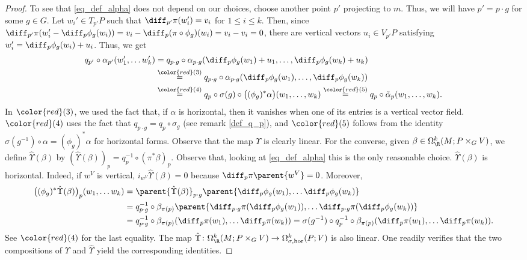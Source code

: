 \begin{proof}
    To see that \eqref{eq_def_alpha} does not depend on our choices, choose another point \(p'\) projecting to \(m\). Thus, we will have \(p'=p\cdot g\) for some \(g \in G\). Let \(w_i'\in T_{p'}P\) such that \(\diff_{p'}\pi(w_i')=v_i\) for \(1 \leq i \leq k\). Then, since \(\diff_{p'}\pi(w_i'-\diff_p\phi_g(w_i))=v_i-\diff_p(\pi \circ \phi_g)(w_i)=v_i-v_i=0\), there are vertical vectors \(u_i \in V_{p'}P\) satisfying \(w_i'=\diff_p\phi_g(w_i)+u_i\). Thus, we get
    \begin{align*}
        q_{p'} \circ {\alpha}_{p'}(w_1', \dots w_k') & = q_{p\cdot g}\circ {\alpha}_{p\cdot g}(\diff_p\phi_g(w_1)+u_1, \ldots, \diff_p\phi_g(w_k)+u_k) \\
        & \overset{{\color{red}(3)}}{=} q_{p\cdot g}\circ {\alpha}_{p\cdot g}(\diff_p\phi_g(w_1), \ldots, \diff_p\phi_g(w_k)) \\
        & \overset{{\color{red}(4)}}{=} q_p \circ \sigma(g) \circ \big((\phi_g)^* {\alpha}\big) (w_1, \ldots , w_k) \overset{{\color{red}(5)}}{=} q_p \circ \tilde{\alpha}_{p}(w_1, \ldots , w_k). 
    \end{align*}
    In \({\color{red}(3)}\), we used the fact that, if \({\alpha}\) is horizontal, then it vanishes when one of its entries is a vertical vector field. \({\color{red}(4)}\) uses the fact that \(q_{p\cdot g}=q_p \circ \sigma_g\) (see remark \ref{def_q_p}), and \({\color{red}(5)}\) follows from the identity \(\sigma(g^{-1}) \circ \alpha = (\phi_g)^*\alpha\) for horizontal forms. Observe that the map \(\Upsilon\) is clearly linear. For the converse, given \(\beta \in \Omega_\R^k(M;P\times_GV)\), we define \(\hat{\Upsilon}(\beta)\) by \( (\hat{\Upsilon}(\beta))_p=q_p^{-1}\circ (\pi^*\beta)_p.\) Observe that, looking at \eqref{eq_def_alpha} this is the only reasonable choice. \(\hat{\Upsilon}(\beta)\) is horizontal. Indeed, if \(w^V\) is vertical, \(i_{w^V}\hat{\Upsilon}(\beta)=0\) because \(\diff_p\pi\parent{w^V}=0\). Moreover,
    \begin{align*}
        \big((\phi_g)^*\hat{\Upsilon}(\beta)\big)_p(w_1, \ldots w_k) & = \parent{\hat{\Upsilon}(\beta)}_{p\cdot g}\parent{\diff_p\phi_g(w_1), \ldots \diff_p\phi_g(w_k)}\\
        &=q_{p\cdot g}^{-1}\circ \beta_{\pi(p)}\parent{\diff_{p\cdot g}\pi(\diff_p\phi_g(w_1)), \ldots \diff_{p\cdot g}\pi(\diff_p\phi_g(w_k))} \\
        & =q_{p\cdot g}^{-1}\circ \beta_{\pi(p)} (\diff_p\pi(w_1), \ldots \diff_p\pi(w_k)) = \sigma(g^{-1})\circ q_p^{-1}\circ \beta_{\pi(p)} (\diff_p\pi(w_1), \ldots \diff_p\pi(w_k)).
    \end{align*}
    See \({\color{red}(4)}\) for the last equality. The map \(\hat{\Upsilon}\colon \Omega_\R^k(M;P \times_G V)\to \Omega_{\sigma, \mathrm{hor}}^k(P;V)\) is also linear. One readily verifies that the two compositions of \(\Upsilon\) and \(\hat{\Upsilon}\) yield the corresponding identities.
 \end{proof}

